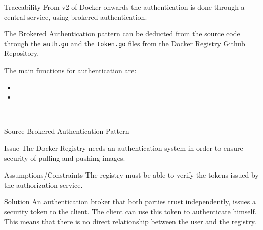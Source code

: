 \begin{patdescription}

\item[Traceability]
From v2 of Docker onwards the authentication is done through a central service, using brokered authentication\cite{dockauth}.

The Brokered Authentication pattern can be deducted from the source code through the \verb|auth.go| and the \verb|token.go| files from the Docker Registry Github Repository.

The main functions for authentication are:
\begin{itemize}
\item {}
\item {}
\end{itemize}
~\\[-2.0cm]
\item[Source]
Brokered Authentication Pattern\cite{brokeredauth}

\item[Issue] The Docker Registry needs an authentication system in order to ensure security of pulling and pushing images.

\item[Assumptions/Constraints] 
The registry must be able to verify the tokens issued by the authorization service.


\item[Solution] 
An authentication broker that both parties trust independently, issues a security token to the client. The client can use this token to authenticate himself. This means that there is no direct relationship between the user and the registry.


\end{patdescription}

